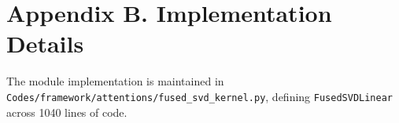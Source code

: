 \section*{Appendix B. Implementation Details}
The module implementation is maintained in \texttt{Codes/framework/attentions/fused\_svd\_kernel.py}, defining \texttt{FusedSVDLinear} across 1040 lines of code.
